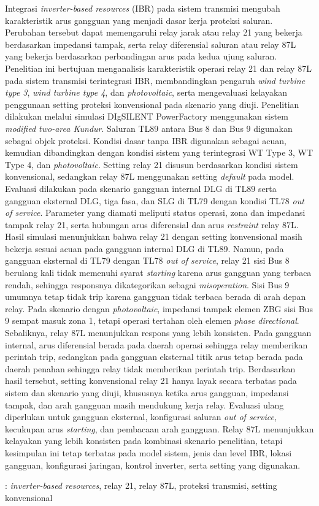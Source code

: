 Integrasi \textit{inverter-based resources} (IBR) pada sistem transmisi mengubah karakteristik arus gangguan yang menjadi dasar kerja proteksi saluran. Perubahan tersebut dapat memengaruhi relay jarak atau relay 21 yang bekerja berdasarkan impedansi tampak, serta relay diferensial saluran atau relay 87L yang bekerja berdasarkan perbandingan arus pada kedua ujung saluran. Penelitian ini bertujuan menganalisis karakteristik operasi relay 21 dan relay 87L pada sistem transmisi terintegrasi IBR, membandingkan pengaruh \textit{wind turbine type 3}, \textit{wind turbine type 4}, dan \textit{photovoltaic}, serta mengevaluasi kelayakan penggunaan setting proteksi konvensional pada skenario yang diuji. Penelitian dilakukan melalui simulasi DIgSILENT PowerFactory menggunakan sistem \textit{modified two-area Kundur}. Saluran TL89 antara Bus 8 dan Bus 9 digunakan sebagai objek proteksi. Kondisi dasar tanpa IBR digunakan sebagai acuan, kemudian dibandingkan dengan kondisi sistem yang terintegrasi WT Type 3, WT Type 4, dan \textit{photovoltaic}. Setting relay 21 disusun berdasarkan kondisi sistem konvensional, sedangkan relay 87L menggunakan setting \textit{default} pada model. Evaluasi dilakukan pada skenario gangguan internal DLG di TL89 serta gangguan eksternal DLG, tiga fasa, dan SLG di TL79 dengan kondisi TL78 \textit{out of service}. Parameter yang diamati meliputi status operasi, zona dan impedansi tampak relay 21, serta hubungan arus diferensial dan arus \textit{restraint} relay 87L. Hasil simulasi menunjukkan bahwa relay 21 dengan setting konvensional masih bekerja sesuai acuan pada gangguan internal DLG di TL89. Namun, pada gangguan eksternal di TL79 dengan TL78 \textit{out of service}, relay 21 sisi Bus 8 berulang kali tidak memenuhi syarat \textit{starting} karena arus gangguan yang terbaca rendah, sehingga responsnya dikategorikan sebagai \textit{misoperation}. Sisi Bus 9 umumnya tetap tidak trip karena gangguan tidak terbaca berada di arah depan relay. Pada skenario dengan \textit{photovoltaic}, impedansi tampak elemen ZBG sisi Bus 9 sempat masuk zona 1, tetapi operasi tertahan oleh elemen \textit{phase directional}. Sebaliknya, relay 87L menunjukkan respons yang lebih konsisten. Pada gangguan internal, arus diferensial berada pada daerah operasi sehingga relay memberikan perintah trip, sedangkan pada gangguan eksternal titik arus tetap berada pada daerah penahan sehingga relay tidak memberikan perintah trip. Berdasarkan hasil tersebut, setting konvensional relay 21 hanya layak secara terbatas pada sistem dan skenario yang diuji, khususnya ketika arus gangguan, impedansi tampak, dan arah gangguan masih mendukung kerja relay. Evaluasi ulang diperlukan untuk gangguan eksternal, konfigurasi saluran \textit{out of service}, kecukupan arus \textit{starting}, dan pembacaan arah gangguan. Relay 87L menunjukkan kelayakan yang lebih konsisten pada kombinasi skenario penelitian, tetapi kesimpulan ini tetap terbatas pada model sistem, jenis dan level IBR, lokasi gangguan, konfigurasi jaringan, kontrol inverter, serta setting yang digunakan.

 : \textit{inverter-based resources}, relay 21, relay 87L, proteksi transmisi, setting konvensional
